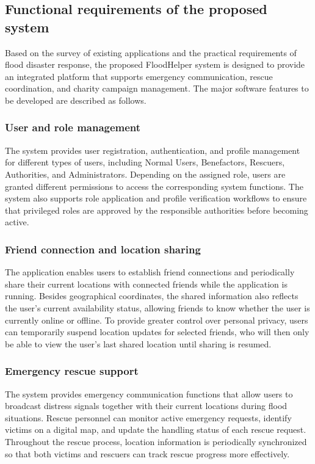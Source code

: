 \documentclass[../Main.tex]{subfiles}
\begin{document}
\subsection{Functional requirements of the proposed system}
\label{subsection:2.1.2}

Based on the survey of existing applications and the practical requirements of flood disaster response, the proposed FloodHelper system is designed to provide an integrated platform that supports emergency communication, rescue coordination, and charity campaign management. The major software features to be developed are described as follows.

\subsubsection{User and role management}
\label{subsubsection:user_role_management}
The system provides user registration, authentication, and profile management for different types of users, including Normal Users, Benefactors, Rescuers, Authorities, and Administrators. Depending on the assigned role, users are granted different permissions to access the corresponding system functions. The system also supports role application and profile verification workflows to ensure that privileged roles are approved by the responsible authorities before becoming active.

\subsubsection{Friend connection and location sharing}
\label{subsubsection:friend_location_sharing}
The application enables users to establish friend connections and periodically share their current locations with connected friends while the application is running. Besides geographical coordinates, the shared information also reflects the user's current availability status, allowing friends to know whether the user is currently online or offline. To provide greater control over personal privacy, users can temporarily suspend location updates for selected friends, who will then only be able to view the user's last shared location until sharing is resumed.

\subsubsection{Emergency rescue support}
\label{subsubsection:emergency_rescue_support}
The system provides emergency communication functions that allow users to broadcast distress signals together with their current locations during flood situations. Rescue personnel can monitor active emergency requests, identify victims on a digital map, and update the handling status of each rescue request. Throughout the rescue process, location information is periodically synchronized so that both victims and rescuers can track rescue progress more effectively.
\end{document}
